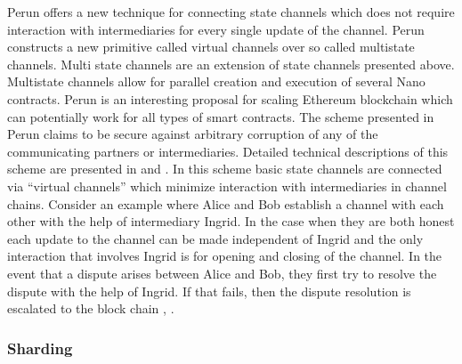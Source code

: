 Perun offers a new technique for connecting state channels which does not require interaction with intermediaries for every single update of the channel. Perun constructs a new primitive called virtual channels over so called multistate channels. Multi state channels are an extension of state channels presented above. Multistate channels allow for parallel creation and execution of several Nano contracts. Perun is an interesting proposal for scaling Ethereum blockchain which can potentially work for all types of smart contracts. The scheme presented in Perun claims to be secure against arbitrary corruption of any of the communicating partners or intermediaries. Detailed technical descriptions of this scheme are presented in \cite{cryptoeprint:2018:320} and \cite{cryptoeprint:2017:635}. In this scheme basic state channels are connected via “virtual channels” which minimize interaction with intermediaries in channel chains. Consider an example where Alice and Bob establish a channel with each other with the help of intermediary Ingrid. In the case when they are both honest each update to the channel can be made independent of Ingrid and the only interaction that involves Ingrid is for opening and closing of the channel. In the event that a dispute arises between Alice and Bob, they first try to resolve the dispute with the help of Ingrid. If that fails, then the dispute resolution is escalated to the block chain \cite{cryptoeprint:2018:320}, \cite{cryptoeprint:2017:635}.

\subsubsection{Sharding}

